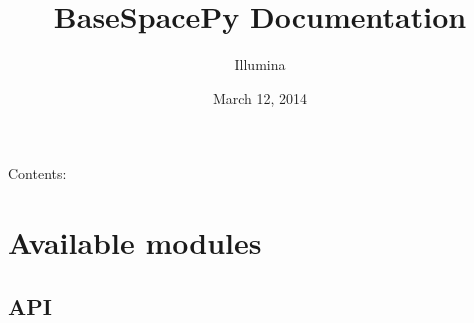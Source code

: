 \documentclass[letterpaper,10pt,english]{sphinxmanual}
\title{BaseSpacePy Documentation}
\date{March 12, 2014}
\author{Illumina}
\begin{document}
\maketitle
\tableofcontents
{}\label{index::doc}


Contents:


\chapter{Available modules}
\label{Available modules:available-modules}\label{Available modules::doc}\label{Available modules:basespacepy}

\section{API}
\label{Available modules:api}
\end{document}
